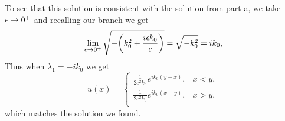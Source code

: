 \documentclass[12pt]{report}
\begin{document}
\begin{solution}
\begin{enumerate}
        \noindent
        To see that this solution is consistent with the solution from part a, we take ${\epsilon} \to 0^+$ and recalling our branch we get
        \[
            \lim_{{\epsilon} \to 0^+} \sqrt{-{\left(k_0^2 + \frac{i {\epsilon} k_0}{c}\right)}} = \sqrt{-k^2_0} = ik_0,
        \]
        Thus when $\lambda_1 = -ik_0$ we get
        \[
            u(x) = \begin{cases}
                \frac{1}{2c^2k_0}e^{ik_0(y-x)}, & x < y,\\ 
                \frac{1}{2c^2k_0}e^{ik_0(x-y)}, & x > y,\\ 
            \end{cases}
        \] 
        which matches the solution we found.
    \end{enumerate}
\end{solution}

\newpage
\end{document}
